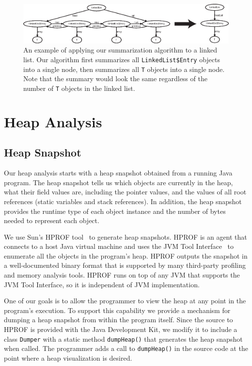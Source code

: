 

\begin{figure}[t]
  \includegraphics[width=\textwidth]{figs/linked-list-both}
  \caption{An example of applying our summarization algorithm to a linked
list.  Our algorithm first summarizes all \texttt{LinkedList\$Entry} objects
into a single node, then summarizes all \texttt{T} objects into a single
node.  Note that the summary would look the same regardless of the number of
\texttt{T} objects in the linked list.}
  \label{fig:linked-list}
\end{figure}


\section{Heap Analysis}
\label{analysis}

\subsection{Heap Snapshot}

Our heap analysis starts with a heap snapshot obtained from a running Java
program.  The heap snapshot tells us which objects are currently in the heap,
what their field values are, including the pointer values, and the values of
all root references (static variables and stack references).  In addition, the
heap snapshot provides the runtime type of each object instance and the number
of bytes needed to represent each object.

We use Sun's HPROF tool~\cite{hprof} to generate heap snapshots. HPROF is an
agent that connects to a host Java virtual machine and uses the JVM Tool
Interface~\cite{jvmti} to enumerate all the objects in the program's heap. 
HPROF outputs the snapshot in a
well-documented binary format that is supported by many third-party profiling
and memory analysis tools.  HPROF runs on top of any JVM that supports the JVM
Tool Interface, so it is independent of JVM implementation.

One of our goals is to allow the programmer to view the heap at any point in
the program's execution. To support this capability we provide a
mechanism for dumping a heap snapshot from within the program itself.  Since the
source to HPROF is provided with the Java Development Kit, we modify it to
include a class \texttt{Dumper} with a static method \texttt{dumpHeap()} that
generates the heap snapshot when called. The programmer adds a call to
\texttt{dumpHeap()} in the source code at the point where a heap visualization
is desired.

